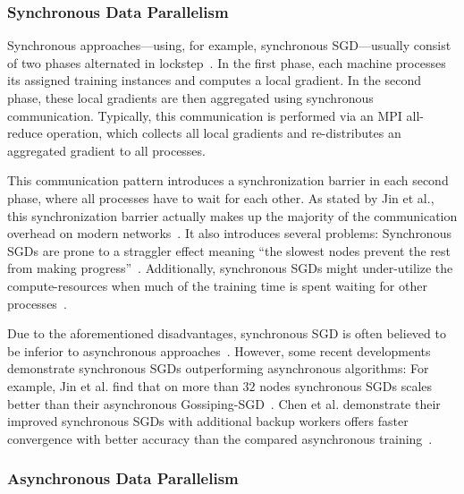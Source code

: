 \documentclass[conference]{IEEEtran}
\begin{document}
\subsubsection{Synchronous Data Parallelism} %
\label{ssub:synchronous_data_parallelism}
Synchronous approaches---using, for example, synchronous SGD---usually consist of two phases alternated in lockstep~\cite{jin2016-How-to-scale}.
In the first phase, each machine processes its assigned training instances and computes a local gradient.
In the second phase, these local gradients are then aggregated using synchronous communication.
Typically, this communication is performed via an MPI all-reduce operation, which collects all local gradients and re-distributes an aggregated gradient to all processes.

This communication pattern introduces a synchronization barrier in each second phase, where all processes have to wait for each other.
As stated by Jin et al., this synchronization barrier actually makes up the majority of the communication overhead on modern networks~\cite{jin2016-How-to-scale}.
It also introduces several problems:
Synchronous SGDs are prone to a straggler effect meaning ``the slowest nodes prevent the rest from making progress''~\cite{jin2016-How-to-scale}.
Additionally, synchronous SGDs might under-utilize the compute-resources when much of the training time is spent waiting for other processes~\cite{jin2016-How-to-scale}.

Due to the aforementioned disadvantages, synchronous SGD is often believed to be inferior to asynchronous approaches~\cite{chen2016-Revisiting-distributed-synchronous-SGD}.
However, some recent developments demonstrate synchronous SGDs outperforming asynchronous algorithms:
For example, Jin et al. find that on more than $32$ nodes synchronous SGDs scales better than their asynchronous Gossiping-SGD~\cite{jin2016-How-to-scale}.
Chen et al. demonstrate their improved synchronous SGDs with additional backup workers offers faster convergence with better accuracy than the compared asynchronous training~\cite{chen2016-Revisiting-distributed-synchronous-SGD}.


\subsubsection{Asynchronous Data Parallelism} %
\label{ssub:asynchronous_data_parallelism}
\end{document}
